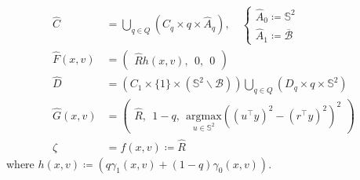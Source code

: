 \documentclass{article}
\newcommand{\brackets}[1]{\left(#1\right)}
\newcommand{\textblue}[1]{\textcolor{blue}{#1}}
\begin{document}
\begin{subequations}\label{eq:hybrid_PCF}
\begin{align} 
    \hat{C} &= \bigcup_{q\in Q}\brackets{{C}_{q}\times q \times \hat{A}_q}, \quad \begin{cases}
        \hat{A}_0 \coloneqq \mathbb{S}^2\\
        \hat{A}_1 \coloneqq \overline{\mathcal{B}}
    \end{cases}\\
    \hat{F}(x, v) &= \begin{pmatrix}
        \hat{R}h(x,v), \:\: 0, \:\: 0
    \end{pmatrix}\label{eq:13b}\\
    \hat{D} &= \brackets{C_1\times\{1\}\times (\mathbb{S}^2\backslash \mathcal{B})} \bigcup_{q\in Q} \brackets{{D}_{q}\times q\times \mathbb{S}^2}\\
    \hat{G}(x, v) &= \begin{pmatrix}
        \hat{R}, \:\: 1-q,\:\: \underset{u\in\mathbb{S}^2}{\mathrm{argmax}}\left((u^\top y)^2 - (r^\top y)^2\right)^2
    \end{pmatrix}\\
    \zeta &= f(x,v)\coloneqq \hat{R} \label{eq:output_hybrid}
\end{align}
\end{subequations}
where $h(x,v)\coloneqq \left(q\gamma_1(x,v) + (1-q)\gamma_0(x,v)\right)$. 



\end{document}
